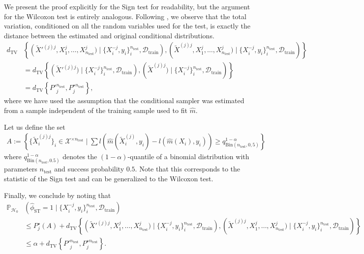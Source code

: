 \documentclass{article}
\theoremstyle{plain}
\theoremstyle{definition}
\theoremstyle{remark}
\begin{document}
We present the proof explicitly for the Sign test for readability, but the argument for the Wilcoxon test is entirely analogous. Following \citet{Berrett}, we observe that the total variation, conditioned on all the random variables used for the test, is exactly the distance between the estimated and original conditional distributions.
\begin{align*}
    d_\mathrm{TV}&\left\{\left(\widetilde{X}'^{(j)j}, X_1^j, \ldots, X_{n_\mathrm{test}}^j)\mid \{X^{-j}_i, y_i\}_i^{n_\mathrm{test}}, \mathcal{D}_\mathrm{train}\right), \left(\widetilde{X}^{(j)j}, X_1^j, \ldots, X_{n_\mathrm{test}}^j)\mid \{X^{-j}_i, y_i\}_i^{n_\mathrm{test}}, \mathcal{D}_\mathrm{train}\right)\right\}\\
    &=d_\mathrm{TV}\left\{\left(\widetilde{X}'^{(j)j})\mid \{X^{-j}_i\}_i^{n_\mathrm{test}}, \mathcal{D}_\mathrm{train}\right), \left(\widetilde{X}^{(j)j})\mid \{X^{-j}_i\}_i^{n_\mathrm{test}}, \mathcal{D}_\mathrm{train}\right)\right\}\\
    &=d_\mathrm{TV}\left\{P'^{n_\mathrm{test}}_j, P^{\star n_\mathrm{test}}_j\right\},
\end{align*}
where we have used the assumption that the conditional sampler was estimated from a sample independent of the training sample used to fit $\widehat{m}$.

Let us define the set 
\begin{align*}
A:= \left\{\{\widetilde{X}^{(j)j}_i\}_i\in \mathcal{X}^{\times n_\mathrm{test}}\mid \sum l\left(\widehat{m}(\widetilde{X}^{(j)}_i, y_i)-l(\widehat{m}(X_i), y_i)\right)\geq q^{1-\alpha}_{\mathrm{Bin}(n_\mathrm{test}, 0,5)}\right\}    
\end{align*}
where $q^{1-\alpha}_{\mathrm{Bin}(n_\mathrm{test}, 0.5)}$ denotes the $(1-\alpha)$-quantile of a binomial distribution with parameters $n_\mathrm{test}$ and success probability $0.5$. Note that this corresponds to the statistic of the Sign test and can be generalized to the Wilcoxon test.


Finally, we conclude by noting that
\begin{align*}
    \mathbb{P}_{\mathcal{H}_0}&\left(\widehat{\phi}_\mathrm{ST}=1\mid \{X^{-j}_i, y_i\}_i^{n_\mathrm{test}}, \mathcal{D}_\mathrm{train}\right)
    \\&\leq P^\star_j(A)+d_\mathrm{TV}\left\{\left(\widetilde{X}'^{(j)j}, X_1^j, \ldots, X_{n_\mathrm{test}}^j)\mid \{X^{-j}_i, y_i\}_i^{n_\mathrm{test}}, \mathcal{D}_\mathrm{train}\right), \left(\widetilde{X}^{(j)j}, X_1^j, \ldots, X_{n_\mathrm{test}}^j)\mid \{X^{-j}_i, y_i\}_i^{n_\mathrm{test}}, \mathcal{D}_\mathrm{train}\right)\right\}
    \\&\leq  \alpha + d_\mathrm{TV}\left\{P'^{n_\mathrm{test}}_j, P^{\star n_\mathrm{test}}_j\right\}.
\end{align*}
\end{document}
